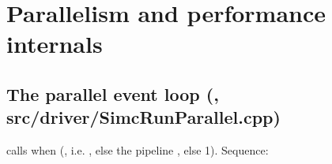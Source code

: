 \chapter{\texorpdfstring{Parallelism and performance internals}{Parallelism and performance internals}}\label{developer_manual-05u5fparallel}
\section{\texorpdfstring{The parallel event loop (, src/\allowbreak{}driver/\allowbreak{}SimcRunParallel.\allowbreak{}cpp)}{The parallel event loop (SimcRun::\allowbreak{}runThreaded,\allowbreak{} src/\allowbreak{}driver/\allowbreak{}SimcRunParallel.\allowbreak{}cpp)}}\label{developer_manual-05u5fparallel:51-the-parallel-event-loop-simcrunrunthreaded-srcdriversimcrunparallelcpp}
 calls  when  (, i.e.
, else the pipeline , else 1). Sequence:

